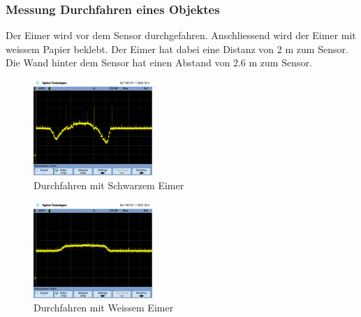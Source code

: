 \subsubsection{Messung Durchfahren eines Objektes}
Der Eimer wird vor dem Sensor durchgefahren. Anschliessend wird der Eimer mit 
weissem Papier beklebt. Der Eimer hat dabei eine Distanz von 2 m zum Sensor. 
Die Wand hinter dem Sensor hat einen Abstand von 2.6 m zum Sensor. 
\begin{figure}[h!]
    \centering
    \includegraphics[width=0.4\textwidth]{fig/scope_75.png}
    \caption{Durchfahren mit Schwarzem Eimer}
    \label{fig:shift_ir_black}
\end{figure}
\begin{figure}[h!]
    \centering
    \includegraphics[width=0.4\textwidth]{fig/scope_77.png}
    \caption{Durchfahren mit Weissem Eimer}
    \label{fig:shift_ir_white}
\end{figure}

